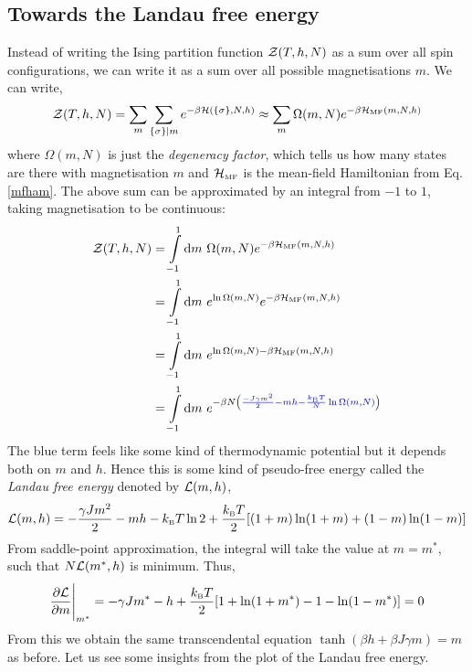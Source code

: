 \subsection{Towards the Landau free energy}
Instead of writing the Ising partition function $\mathcal Z(T,h,N)$ as a sum over all spin configurations, we can write it as a sum over all possible magnetisations $m$. We can write, 
\begin{align*}
    \mathcal Z(T,h,N) = \sum\limits_m \sum\limits_{\{\sigma\}|m} e^{-\beta \mathcal H(\{\sigma\}, N,h)} \approx \sum\limits_m \Omega(m,N) e^{-\beta \mathcal H_{\text{\tiny MF}}(m,N,h)}
\end{align*}
where $\Omega(m,N)$ is just the \textit{degeneracy factor}, which tells us how many states are there with magnetisation $m$ and $\mathcal H_{\text{\tiny MF}}$ is the mean-field Hamiltonian from Eq. \eqref{mfham}. The above sum can be approximated by an integral from $-1$ to $1$, taking magnetisation to be continuous:
\begin{align}\label{landpart}
     \begin{split}
        \SZ(T,h,N) &= \int\limits_{-1}^1 \dd m\ \Omega(m,N) e^{-\beta \SH\tund{MF}(m,N,h)}\\
     &=\int\limits_{-1}^1 \dd m\ e^{\ln \Omega(m,N)} e^{-\beta \SH\tund{MF}(m,N,h)}\\
     &=\int\limits_{-1}^1 \dd m\ e^{\ln \Omega(m,N) -\beta \SH\tund{MF}(m,N,h)}\\
     &=\int\limits_{-1}^1 \dd m\ e^{-\beta N\qty(\mathcolor{blue}{\frac{-J\gamma m^2}{2} - mh -\frac{\kb T}{N} \ln \Omega(m,N) } )}
     \end{split}
\end{align}
The blue term feels like some kind of thermodynamic potential but it depends both on $m$ and $h$. Hence this is some kind of pseudo-free energy called the \textit{Landau free energy} denoted by $\mathcal L(m,h)$,
\begin{align*}
    \mathcal L(m,h) = -\frac{\gamma J m^2}{2} - mh -k_{\text{\tiny B}} T \ln 2 + \frac{k_{\text{\tiny B}} T}{2}\qty[(1+m)\ln (1+m) + (1-m)\ln (1-m)]
\end{align*}
From saddle-point approximation, the integral will take the value at $m=m^*$, such that $N\mathcal L(m^*,h)$ is minimum. Thus, 
\begin{align*}
    \pdv{\mathcal L}{m}\Bigg|_{m^*} = -\gamma J m^* - h + \frac{k_{\text{\tiny B}} T}{2}\qty[1 +\ln(1+m^*) -1 - \ln(1-m^*)] =0 
\end{align*}
From this we obtain the same transcendental equation $\tanh(\beta h +\beta J \gamma m) = m$ as before. Let us see some insights from the plot of the Landau free energy.
